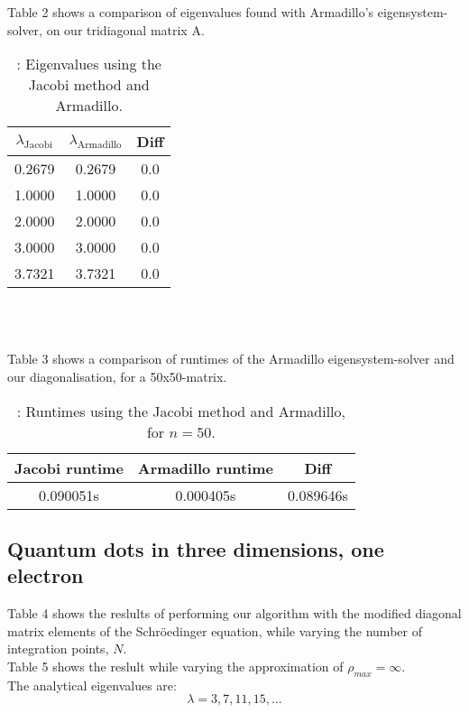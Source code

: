 \documentclass{article}
\begin{document}
	Table 2 shows a comparison of eigenvalues found with Armadillo's eigensystem-solver,
	on our tridiagonal matrix A.
	\begin{table}[h!]
		\caption{: Eigenvalues using the Jacobi method and Armadillo.}
		\begin{tabular}{c c c}
			$\lambda_{\text{Jacobi}}$ & $\lambda_{\text{Armadillo}}$ & Diff\\
			\hline
			0.2679 & 0.2679 & 0.0 \\
			1.0000 & 1.0000 & 0.0 \\
			2.0000 & 2.0000 & 0.0 \\
			3.0000 & 3.0000 & 0.0 \\
			3.7321 & 3.7321 & 0.0
		\end{tabular} \\ \\
	\end{table}

	Table 3 shows a comparison of runtimes of the Armadillo eigensystem-solver and our diagonalisation,
	for a 50x50-matrix.

	\begin{table}[h!]
		\caption{: Runtimes using the Jacobi method and Armadillo, for $n=50$.}
		\begin{tabular}{c c c}
			Jacobi runtime & Armadillo runtime & Diff\\
			\hline
			0.090051s & 0.000405s & 0.089646s
		\end{tabular}
	\end{table}

	\subsection{Quantum dots in three dimensions, one electron}
		Table 4 shows the reslults of performing our algorithm with the modified diagonal matrix elements
		of the Schröedinger equation, while varying the number of integration points, $N$. \\
		Table 5 shows the reslult while varying the approximation of $\rho_{max} = \infty$. \\
		The analytical eigenvalues are:
		\begin{equation*}
			\lambda = 3,7,11,15,\hdots
		\end{equation*}
		
\end{document}
